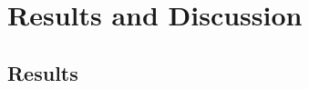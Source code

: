 \chapter{Results and Discussion}\label{chap:results_discussion}
\section{Results}\label{sec:results}






